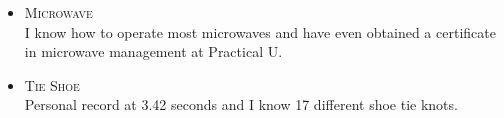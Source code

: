 





\begin{itemize}[leftmargin=7mm, itemsep=2mm, parsep=0mm]
	\item[\lline{olofblue}] {\fontsize{11}{0}\textsc{Microwave}}
	\\
	{\small I know how to operate most microwaves and have even obtained a certificate in microwave management at Practical U.} 
    
	\item[\lline{olofblue}] {\fontsize{11}{0}\textsc{Tie Shoe}}
	\\
	{\small Personal record at 3.42 seconds and I know 17 different shoe tie knots.}
\end{itemize}

